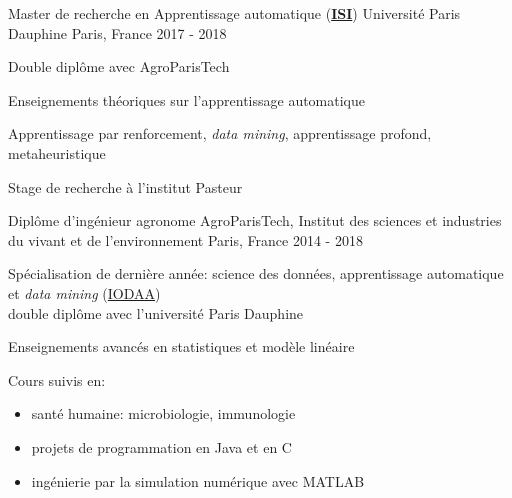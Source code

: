 

\begin{cventries}

  \cventry
    {Master de recherche en Apprentissage automatique (\href{https://mido.dauphine.fr/fr/formations-et-diplomes/masters-2/master-2-informatique/parcours-isi/presentation.html}{\textbf{ISI}})} %
    {Université Paris Dauphine} %
    {Paris, France} %
    {2017 - 2018} %
    {
      \begin{cvitems} %
        \item {Double diplôme avec AgroParisTech}
        \item {Enseignements théoriques sur l'apprentissage automatique}
        \item {Apprentissage par renforcement, \textit{data mining}, apprentissage profond, metaheuristique} 
        \item {Stage de recherche à l'institut Pasteur}
      \end{cvitems}
    }
  
    \cventry
    {Diplôme d'ingénieur agronome} %
    {AgroParisTech, Institut des sciences et industries du vivant et de l'environnement} %
    {Paris, France} %
    {2014 - 2018} %
    {
      \begin{cvitems} %
        \item {Spécialisation de dernière année: science des données, apprentissage automatique et \textit{data mining} (\href{http://www2.agroparistech.fr/ufr-info/iodaa/}{IODAA})\\ double diplôme avec l'université Paris Dauphine}
        \item {Enseignements avancés en statistiques et modèle linéaire}
        \item {Cours suivis en: \begin{itemize}
          \item santé humaine: microbiologie, immunologie
          \item projets de programmation en Java et en C
          \item ingénierie par la simulation numérique avec MATLAB
        \end{itemize}}
      \end{cvitems}
    }


\end{cventries}
